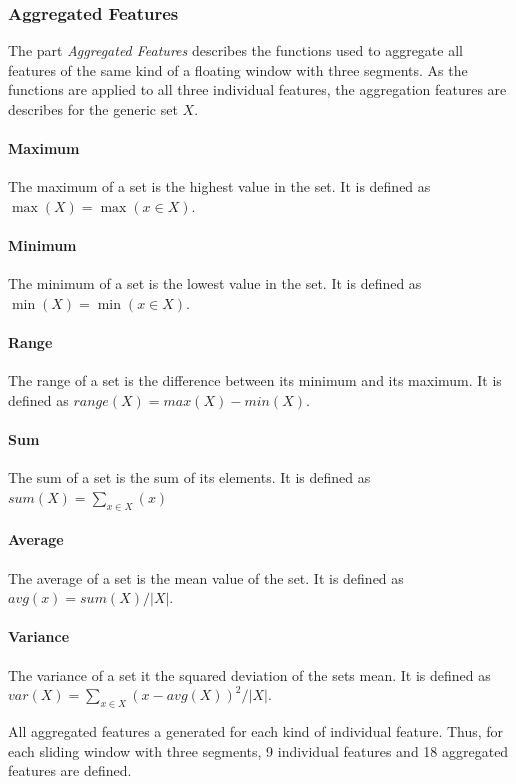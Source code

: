 \subsubsection{Aggregated Features}
The part \textit{Aggregated Features} describes the functions used to aggregate all features of the same kind of a floating window with three segments. As the functions are applied to all three individual features, the aggregation features are describes for the generic set $X$.

\paragraph{Maximum} The maximum of a set is the highest value in the set. It is defined as $ \max (X) = \max(x \in X)$.

\paragraph{Minimum} The minimum of a set is the lowest value in the set. It is defined as $ \min (X) = \min (x \in X) $.

\paragraph{Range} The range of a set is the difference between its minimum and its maximum. It is defined as $ range(X) = max(X) - min(X)$.  

\paragraph{Sum} The sum of a set is the sum of its elements. It is defined as $sum(X) = \sum_{x\in X} (x)$

\paragraph{Average} The average of a set is the mean value of the set. It is defined as $ avg (x) = sum(X)/|X|$.

\paragraph{Variance} The variance of a set it the squared deviation of the sets mean. It is defined as $var (X) = \sum_{x\in X} (x - avg(X))^2/|X| $.  

All aggregated features a generated for each kind of individual feature. Thus, for each sliding window with three segments, 9 individual features and 18 aggregated features are defined. 

